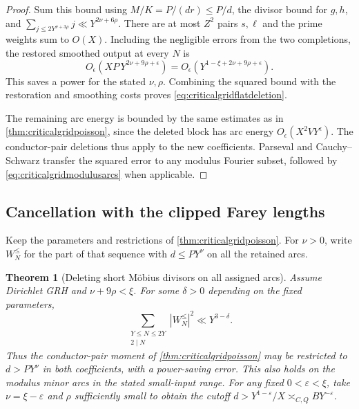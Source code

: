 \documentclass[11pt,a4paper]{article}
\numberwithin{equation}{section}
\newtheorem{theorem}{Theorem}[section]
\begin{document}
\begin{proof}
Sum this bound using $M/K=P/(dr)\le P/d$,
the divisor bound for $g,h$, and
$\sum_{j\le 2Y^{\nu+3\rho}} j\ll Y^{2\nu+6\rho}$.
There are at most $Z^2$ pairs $s,\ell$ and the prime
weights sum to $O(X)$. Including the negligible errors
from the two completions, the restored smoothed output
at every $N$ is
\[
 O_\epsilon\!\left(XP\,Y^{2\nu+9\rho+\epsilon}\right)
       =O_\epsilon\!\left(Y^{1-\xi+2\nu+9\rho+\epsilon}\right).
\]
This saves a power for the stated $\nu,\rho$.
Combining the squared bound with the restoration
and smoothing costs proves \cref{eq:criticalgridflatdeletion}.

The remaining arc energy is bounded by the same estimates
as in \cref{thm:criticalgridpoisson}, since the deleted block
has arc energy $O_\epsilon(X^2 VY^\epsilon)$.
The conductor-pair deletions thus apply to the new
coefficients. Parseval and Cauchy--Schwarz transfer the
squared error to any modulus Fourier subset, followed by
\cref{eq:criticalgridmodulusarcs} when applicable.
\end{proof}

\clearpage
\subsection{Cancellation with the clipped Farey lengths}

Keep the parameters and restrictions of
\cref{thm:criticalgridpoisson}. For $\nu>0$, write
$W_N^{\le}$ for the part of that sequence with
$d\le P Y^\nu$ on all the retained arcs.

\begin{theorem}[Deleting short M\"obius divisors on all assigned arcs]
\label{thm:criticalgridclippeddeletion}
Assume Dirichlet GRH and $\nu+9\rho<\xi$.
For some $\delta>0$ depending on the fixed parameters,
\begin{equation}
 \sum_{\substack{Y\le N\le 2Y\\2\mid N}}|W_N^{\le}|^2
                 \ll Y^{3-\delta}.
 \label{eq:criticalgridclippeddeletion}
\end{equation}
Thus the conductor-pair moment of \cref{thm:criticalgridpoisson}
may be restricted to $d>P Y^\nu$ in both coefficients, with
a power-saving error. This also holds on the modulus minor
arcs in the stated small-input range.
For any fixed $0<\varepsilon<\xi$, take
$\nu=\xi-\varepsilon$ and $\rho$ sufficiently small
to obtain the cutoff $d>Y^{1-\varepsilon}/X
\asymp_{C,Q} B Y^{-\varepsilon}$.
\end{theorem}
\end{document}
